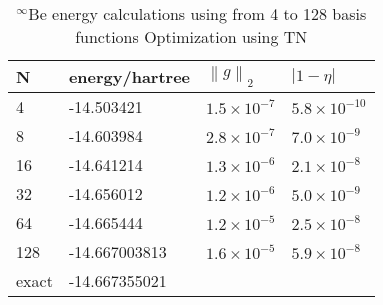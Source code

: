\documentclass[12pt,thmsa]{article}
\begin{document}
\begin{table}[p] \centering%
\begin{tabular}{llll}
\hline\hline
N & energy/hartree & $\left\| g\right\| _2$ & $\left| 1-\eta \right| $ \\ 
\hline
4 & -14.503421 & $1.5\times 10^{-7}$ & $5.8\times 10^{-10}$ \\ 
8 & -14.603984 & $2.8\times 10^{-7}$ & $7.0\times 10^{-9}$ \\ 
16 & -14.641214 & $1.3\times 10^{-6}$ & $2.1\times 10^{-8}$ \\ 
32 & -14.656012 & $1.2\times 10^{-6}$ & $5.0\times 10^{-9}$ \\ 
64 & -14.665444 & $1.2\times 10^{-5}$ & $2.5\times 10^{-8}$ \\ 
128 & -14.667003813 & $1.6\times 10^{-5}$ & $5.9\times 10^{-8}$ \\ 
exact\cite{Baker90} & -14.667355021 &  &  \\ \hline\hline
\end{tabular}
\caption{$ ^{\infty}$Be energy calculations using from 4 to 128 basis functions
 Optimization using TN\label{Beeng}}%
\end{table}%



\end{document}
